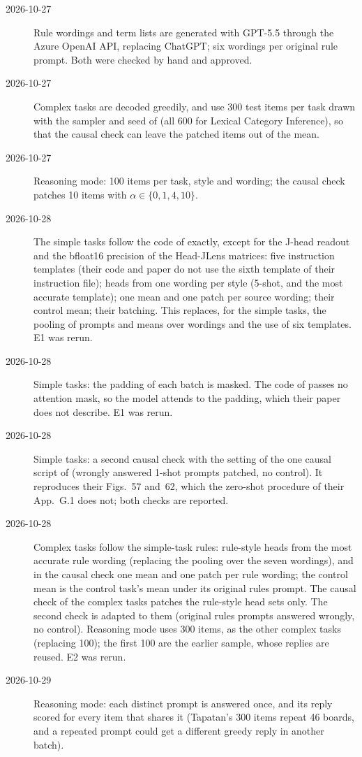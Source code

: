 \documentclass[11pt,a4paper]{article}
\begin{document}
\begin{description}
\item[2026-10-27] Rule wordings and term lists are generated with GPT-5.5 through the Azure OpenAI API, replacing ChatGPT; six wordings per original rule prompt. Both were checked by hand and approved.
\item[2026-10-27] Complex tasks are decoded greedily, and use 300 test items per task drawn with the sampler and seed of \citet{fu2026rules} (all 600 for Lexical Category Inference), so that the causal check can leave the patched items out of the mean.
\item[2026-10-27] Reasoning mode: 100 items per task, style and wording; the causal check patches 10 items with $\alpha\in\{0,1,4,10\}$.
\item[2026-10-28] The simple tasks follow the code of \citet{yang2026shared} exactly, except for the J-head readout and the bfloat16 precision of the Head-JLens matrices: five instruction templates (their code and paper do not use the sixth template of their instruction file); heads from one wording per style (5-shot, and the most accurate template); one mean and one patch per source wording; their control mean; their batching. This replaces, for the simple tasks, the pooling of prompts and means over wordings and the use of six templates. E1 was rerun.
\item[2026-10-28] Simple tasks: the padding of each batch is masked. The code of \citet{yang2026shared} passes no attention mask, so the model attends to the padding, which their paper does not describe. E1 was rerun.
\item[2026-10-28] Simple tasks: a second causal check with the setting of the one causal script of \citet{yang2026shared} (wrongly answered 1-shot prompts patched, no control). It reproduces their Figs.~57 and~62, which the zero-shot procedure of their App.~G.1 does not; both checks are reported.
\item[2026-10-28] Complex tasks follow the simple-task rules: rule-style heads from the most accurate rule wording (replacing the pooling over the seven wordings), and in the causal check one mean and one patch per rule wording; the control mean is the control task's mean under its original rules prompt. The causal check of the complex tasks patches the rule-style head sets only. The second check is adapted to them (original rules prompts answered wrongly, no control). Reasoning mode uses 300 items, as the other complex tasks (replacing 100); the first 100 are the earlier sample, whose replies are reused. E2 was rerun.
\item[2026-10-29] Reasoning mode: each distinct prompt is answered once, and its reply scored for every item that shares it (Tapatan's 300 items repeat 46 boards, and a repeated prompt could get a different greedy reply in another batch).

\end{description}
\end{document}
